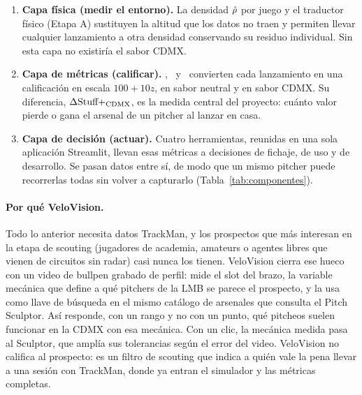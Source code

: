 \documentclass[10pt]{article}
\begin{document}
\begin{enumerate}
  \item \textbf{Capa física (medir el entorno).} La densidad $\hat{\rho}$ por juego y el traductor físico (Etapa A) sustituyen la altitud que los datos no traen y permiten llevar cualquier lanzamiento a otra densidad conservando su residuo individual. Sin esta capa no existiría el sabor CDMX.
  \item \textbf{Capa de métricas (calificar).} \splus, \lplus\ y \pplus\ convierten cada lanzamiento en una calificación en escala $100+10z$, en sabor neutral y en sabor CDMX. Su diferencia, $\Delta\text{Stuff+}_{\text{CDMX}}$, es la medida central del proyecto: cuánto valor pierde o gana el arsenal de un pitcher al lanzar en casa.
  \item \textbf{Capa de decisión (actuar).} Cuatro herramientas, reunidas en una sola aplicación Streamlit, llevan esas métricas a decisiones de fichaje, de uso y de desarrollo. Se pasan datos entre sí, de modo que un mismo pitcher puede recorrerlas todas sin volver a capturarlo (Tabla~\ref{tab:componentes}).
\end{enumerate}

\paragraph{Por qué VeloVision.} Todo lo anterior necesita datos TrackMan, y los prospectos que más interesan en la etapa de scouting (jugadores de academia, amateurs o agentes libres que vienen de circuitos sin radar) casi nunca los tienen. VeloVision cierra ese hueco con un video de bullpen grabado de perfil: mide el slot del brazo, la variable mecánica que define a qué pitchers de la LMB se parece el prospecto, y la usa como llave de búsqueda en el mismo catálogo de arsenales que consulta el Pitch Sculptor. Así responde, con un rango y no con un punto, qué pitcheos suelen funcionar en la CDMX con esa mecánica. Con un clic, la mecánica medida pasa al Sculptor, que amplía sus tolerancias según el error del video. VeloVision no califica al prospecto: es un filtro de scouting que indica a quién vale la pena llevar a una sesión con TrackMan, donde ya entran el simulador y las métricas completas.
\end{document}
